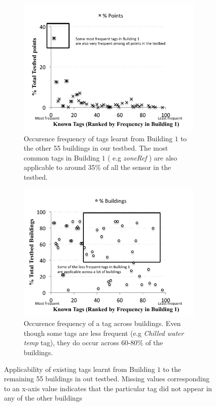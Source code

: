 \begin{figure}[h!]
\centering
	\begin{subfigure}{0.48\textwidth}
                \centering
		\includegraphics[width=\textwidth]{./figs/campusWideStats-point.pdf}
                \caption{Occurence frequency of tags learnt from Building $1$ to the other 55 buildings in our testbed. The most common tags in Building $1$ ( e.g {\it zoneRef} ) are also applicable to around 35\% of all the sensor in the testbed.}
                \label{fig:campusWideStats-build}
	\end{subfigure}
	\begin{subfigure}{0.48\textwidth}
                \centering
		\includegraphics[width=\textwidth]{./figs/campusWideStats-build.pdf}
                \caption{Occurence frequency of a tag across buildings. Even though some tags are less frequent (e.g {\it Chilled water temp} tag), they do occur across 60-80\% of the buildings. }
                \label{fig:campusWideStats-build}
	\end{subfigure}
\caption{Applicability of existing tags learnt from Building $1$ to the remaining 55 buildings in out testbed. Missing values corresponding to an x-axis value indicates that the particular tag did not appear in any of the other buildings}
\end{figure}


